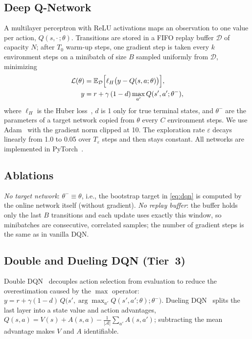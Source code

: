 \documentclass[conference]{IEEEtran}
\begin{document}
\subsection{Deep Q-Network}
A multilayer perceptron with ReLU activations maps an observation to one value per action,
$Q(s,\cdot\,;\theta)$. Transitions are stored in a FIFO replay buffer $\mathcal{D}$ of
capacity $N$; after $T_0$ warm-up steps, one gradient step is taken every $k$ environment
steps on a minibatch of size $B$ sampled uniformly from $\mathcal{D}$, minimizing
\begin{align}
\mathcal{L}(\theta) &= \mathbb{E}_{\mathcal{D}}\Bigl[\ell_{H}\bigl(y - Q(s,a;\theta)\bigr)\Bigr], \\
y &= r + \gamma\,(1-d)\max_{a'} Q(s',a';\theta^{-}), \label{eq:dqn}
\end{align}
where $\ell_H$ is the Huber loss~\cite{huber1964}, $d$ is 1 only for true terminal states,
and $\theta^-$ are the parameters of a target network copied from $\theta$ every $C$
environment steps. We use Adam~\cite{kingma2015} with the gradient norm clipped at 10. The
exploration rate $\varepsilon$ decays linearly from 1.0 to 0.05 over $T_\varepsilon$ steps
and then stays constant. All networks are implemented in PyTorch~\cite{paszke2019}.

\subsection{Ablations}
\emph{No target network}: $\theta^- \equiv \theta$, i.e., the bootstrap target in
\eqref{eq:dqn} is computed by the online network itself (without gradient).
\emph{No replay buffer}: the buffer holds only the last $B$ transitions and each update uses
exactly this window, so minibatches are consecutive, correlated samples; the number of
gradient steps is the same as in vanilla DQN.

\subsection{Double and Dueling DQN (Tier~3)}
Double DQN~\cite{vanhasselt2016} decouples action selection from evaluation to reduce the
overestimation caused by the $\max$ operator:
$y = r + \gamma(1-d)\,Q\bigl(s',\arg\max_{a'}Q(s',a';\theta);\theta^-\bigr)$.
Dueling DQN~\cite{wang2016} splits the last layer into a state value and action advantages,
$Q(s,a) = V(s) + A(s,a) - \frac{1}{|\mathcal{A}|}\sum_{a'}A(s,a')$; subtracting the mean
advantage makes $V$ and $A$ identifiable.
\end{document}
